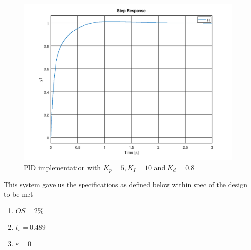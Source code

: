 \documentclass[a4paper, 12pt]{article}
\begin{document}
\begin{figure}[H]
	\centering
	\includegraphics[width=\textwidth]{Images/question_4_PID.png}
	\caption{PID implementation with $K_p = 5, K_I = 10$ and $K_d = 0.8$}
	\label{fig:question_4_pid}
\end{figure}

This system gave us the specifications as defined below within spec of the design to be met
\begin{enumerate}
	\item $OS = 2\%$
	\item $t_s = 0.489$
	\item $\varepsilon = 0$
\end{enumerate}


\end{document}
